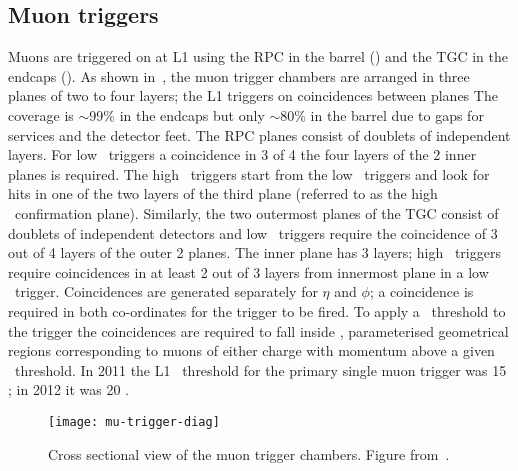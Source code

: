 \subsection{Muon triggers}
\label{sec:reco-mu-triggers}

Muons are triggered on at L1 using the RPC in the barrel () and
the TGC in the endcaps (). As shown in~, the
muon trigger chambers are arranged in three planes of two to four layers; the L1
triggers on coincidences between planes The coverage is $\sim$99\% in the
endcaps but only $\sim$80\% in the barrel due to gaps for services and the
detector feet.  The RPC planes consist of doublets of independent layers. For
low \pt\ triggers a coincidence in 3 of 4 the four layers of the 2 inner planes
is required. The high \pt\ triggers start from the low \pt\ triggers and look
for hits in one of the two layers of the third plane (referred to as the high
\pt\ confirmation plane). Similarly, the two outermost planes of the TGC consist
of doublets of independent detectors and low \pt\ triggers require the
coincidence of 3 out of 4 layers of the outer 2 planes. The inner plane has 3
layers; high \pt\ triggers require coincidences in at least 2 out of 3 layers
from innermost plane in a low \pt\ trigger. Coincidences are generated
separately for $\eta$ and $\phi$; a coincidence is required in both co-ordinates
for the trigger to be fired. To apply a \pt\ threshold to the trigger the
coincidences are required to fall inside , parameterised
geometrical regions corresponding to muons of either charge with momentum above
a given \pt\ threshold. In 2011 the L1 \pt\ threshold for the primary single
muon trigger was 15 \GeV; in 2012 it was 20 \GeV.

\begin{figure}[h]
\centering
            \texttt{[image: mu-trigger-diag]}
\caption{
Cross sectional view of the muon trigger chambers. Figure from~\cite{Aad:2012xs}.}
\label{fig:mu-trigger-diag}
\end{figure}

